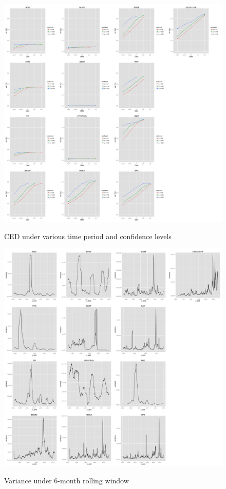 \documentclass[12pt]{article}
\begin{document}
\begin{figure}[h]
\caption{CED under various time period and confidence levels}
\centering 
\includegraphics[width=16cm]{../results/CED}
\label{fig: CED}
\end{figure}

\begin{figure}[h]
\caption{Variance under 6-month rolling window} 
\centering 
\includegraphics[width=16cm]{../results/variance6mon}
\label{fig: variance6mon}
\end{figure}
\end{document}
